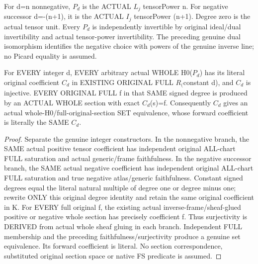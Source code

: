 \begin{definition}
\label{def:seven-native-signed-coordinate-powers}
\leanok
For d=n nonnegative, $P_d$ is the ACTUAL $L_j$ tensorPower n. For negative
successor d=-(n+1), it is the ACTUAL $I_j$ tensorPower (n+1). Degree zero
is the actual tensor unit. Every $P_d$ is independently invertible by
original ideal/dual invertibility and actual tensor-power invertibility.
The preceding genuine dual isomorphism identifies the negative choice
with powers of the genuine inverse line; no Picard equality is assumed.
\end{definition}

\begin{theorem}
\label{thm:seven-native-signed-coordinate-full-h0}
\leanok
For EVERY integer d, EVERY arbitrary actual WHOLE H0($P_d$) has its literal
original coefficient $C_d$ in EXISTING ORIGINAL FULL $R_($constant d), and
$C_d$ is injective. EVERY ORIGINAL FULL f in that SAME signed degree is
produced by an ACTUAL WHOLE section with exact $C_d$(s)=f. Consequently
$C_d$ gives an actual whole-H0/full-original-section SET equivalence,
whose forward coefficient is literally the SAME $C_d$.
\end{theorem}
\begin{proof}
Separate the genuine integer constructors. In the nonnegative branch,
the SAME actual positive tensor coefficient has independent original
ALL-chart FULL saturation and actual generic/frame faithfulness. In
the negative successor branch, the SAME actual negative coefficient
has independent original ALL-chart FULL saturation and true negative
atlas/generic faithfulness. Constant signed degrees equal the literal
natural multiple of degree one or degree minus one; rewrite ONLY this
original degree identity and retain the same original coefficient in K.
For EVERY full original f, the existing actual inverse-frame/sheaf-glued
positive or negative whole section has precisely coefficient f. Thus
surjectivity is DERIVED from actual whole sheaf gluing in each branch.
Independent FULL membership and the preceding faithfulness/surjectivity
produce a genuine set equivalence. Its forward coefficient is literal.
No section correspondence, substituted original section space or native
FS predicate is assumed.
\end{proof}

